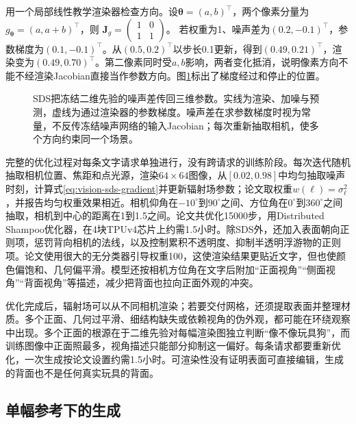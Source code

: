 用一个局部线性教学渲染器检查方向。设$\bm\theta=(a,b)^\top$，两个像素分量为$g_{\bm\theta}=(a,a+b)^\top$，则
$\bm J_g=\left(\begin{smallmatrix}1&0\\1&1\end{smallmatrix}\right)$。
若权重为1、噪声差为$(0.2,-0.1)^\top$，参数梯度为$(0.1,-0.1)^\top$。从$(0.5,0.2)^\top$以步长0.1更新，得到$(0.49,0.21)^\top$，渲染变为$(0.49,0.70)^\top$。第二像素同时受$a,b$影响，两者变化抵消，说明像素方向不能不经渲染Jacobian直接当作参数方向。图\ref{fig:vision-sds-path}标出了梯度经过和停止的位置。

\begin{figure}[tbp]
  \centering
  
  \caption{SDS把冻结二维先验的噪声差传回三维参数。实线为渲染、加噪与预测，虚线为通过渲染器的参数梯度。噪声差在求参数梯度时视为常量，不反传冻结噪声网络的输入Jacobian；每次重新抽取相机，使多个方向约束同一个场景。}
  \label{fig:vision-sds-path}
\end{figure}
\FloatBarrier

完整的优化过程对每条文字请求单独进行，没有跨请求的训练阶段。每次迭代随机抽取相机位置、焦距和点光源，渲染$64\times64$图像，从$[0.02,0.98]$中均匀抽取噪声时刻，计算式\eqref{eq:vision-sds-gradient}并更新辐射场参数；论文取权重$w(\ell)=\sigma_\ell^2$，并报告均匀权重效果相近。相机仰角在$-10^\circ$到$90^\circ$之间、方位角在$0^\circ$到$360^\circ$之间抽取，相机到中心的距离在1到1.5之间。论文共优化15000步，用Distributed Shampoo优化器，在4块TPUv4芯片上约需1.5小时。除SDS外，还加入表面朝向正则项，惩罚背向相机的法线，以及控制累积不透明度、抑制半透明浮游物的正则项。论文使用很大的无分类器引导权重100，这使渲染结果更贴近文字，但也使颜色偏饱和、几何偏平滑。模型还按相机方位角在文字后附加“正面视角”“侧面视角”“背面视角”等描述，减少把背面也拉向正面外观的冲突。

优化完成后，辐射场可以从不同相机渲染；若要交付网格，还须提取表面并整理材质。多个正面、几何过平滑、细结构缺失或依赖视角的伪外观，都可能在环绕观察中出现。多个正面的根源在于二维先验对每幅渲染图独立判断“像不像玩具狗”，而训练图像中正面照最多，视角描述只能部分抑制这一偏好。每条请求都要重新优化，一次生成按论文设置约需1.5小时。可渲染性没有证明表面可直接编辑，生成的背面也不是任何真实玩具的背面。

\subsection{单幅参考下的生成}
\label{sec:vision-multigen-single-reference}
\label{sec:vision-multigen-wonder3d}

